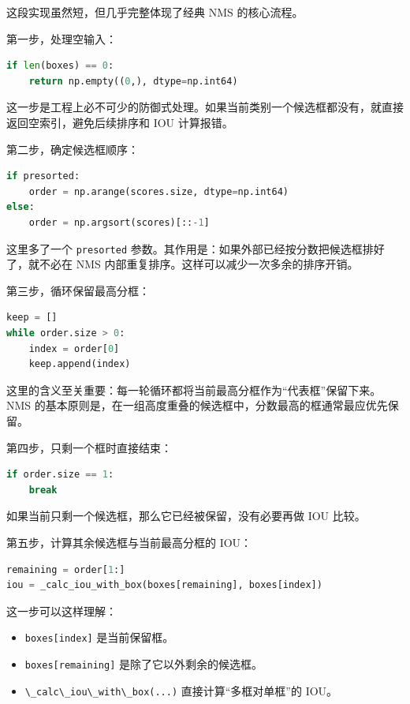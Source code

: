 这段实现虽然短，但几乎完整体现了经典 NMS 的核心流程。

第一步，处理空输入：

\begin{lstlisting}[language=Python]
if len(boxes) == 0:
    return np.empty((0,), dtype=np.int64)
\end{lstlisting}

这一步是工程上必不可少的防御式处理。如果当前类别一个候选框都没有，就直接返回空索引，避免后续排序和
IOU 计算报错。

第二步，确定候选框顺序：

\begin{lstlisting}[language=Python]
if presorted:
    order = np.arange(scores.size, dtype=np.int64)
else:
    order = np.argsort(scores)[::-1]
\end{lstlisting}

这里多了一个 \passthrough{\lstinline!presorted!}
参数。其作用是：如果外部已经按分数把候选框排好了，就不必在 NMS
内部重复排序。这样可以减少一次多余的排序开销。

第三步，循环保留最高分框：

\begin{lstlisting}[language=Python]
keep = []
while order.size > 0:
    index = order[0]
    keep.append(index)
\end{lstlisting}

这里的含义至关重要：每一轮循环都将当前最高分框作为``代表框''保留下来。NMS
的基本原则是，在一组高度重叠的候选框中，分数最高的框通常最应优先保留。

第四步，只剩一个框时直接结束：

\begin{lstlisting}[language=Python]
if order.size == 1:
    break
\end{lstlisting}

如果当前只剩一个候选框，那么它已经被保留，没有必要再做 IOU 比较。

第五步，计算其余候选框与当前最高分框的 IOU：

\begin{lstlisting}[language=Python]
remaining = order[1:]
iou = _calc_iou_with_box(boxes[remaining], boxes[index])
\end{lstlisting}

这一步可以这样理解：

\begin{itemize}
\tightlist
\item
  \passthrough{\lstinline!boxes[index]!} 是当前保留框。
\item
  \passthrough{\lstinline!boxes[remaining]!} 是除了它以外剩余的候选框。
\item
  \passthrough{\lstinline!\_calc\_iou\_with\_box(...)!}
  直接计算``多框对单框''的 IOU。
\end{itemize}

